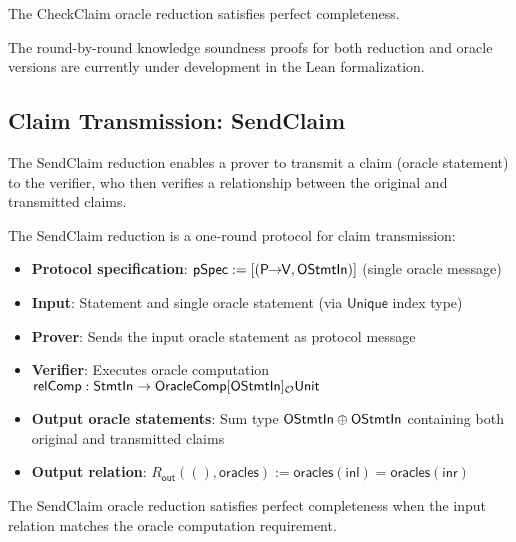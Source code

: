 \begin{theorem}
    The CheckClaim oracle reduction satisfies perfect completeness.
\end{theorem}

\begin{remark}
    The round-by-round knowledge soundness proofs for both reduction and oracle versions are currently under development in the Lean formalization.
\end{remark}

\subsection{Claim Transmission: SendClaim}

The SendClaim reduction enables a prover to transmit a claim (oracle statement) to the verifier, who then verifies a relationship between the original and transmitted claims.

\begin{definition}
    \label{def:sendclaim_oracle_reduction}
    The SendClaim reduction is a one-round protocol for claim transmission:
    \begin{itemize}
        \item \textbf{Protocol specification}: $\mathsf{pSpec} := [(\mathsf{P \!\!\rightarrow\!\! V}, \mathsf{OStmtIn})]$ (single oracle message)
        \item \textbf{Input}: Statement and single oracle statement (via $\mathsf{Unique}$ index type)
        \item \textbf{Prover}: Sends the input oracle statement as protocol message
        \item \textbf{Verifier}: Executes oracle computation $\mathsf{relComp} : \mathsf{StmtIn} \to \mathsf{OracleComp}[\mathsf{OStmtIn}]_{\mathcal{O}} \mathsf{Unit}$
        \item \textbf{Output oracle statements}: Sum type $\mathsf{OStmtIn} \oplus \mathsf{OStmtIn}$ containing both original and transmitted claims
        \item \textbf{Output relation}: $R_{\mathsf{out}}((), \mathsf{oracles}) := \mathsf{oracles}(\mathsf{inl}) = \mathsf{oracles}(\mathsf{inr})$
    \end{itemize}
\end{definition}

\begin{theorem}
    The SendClaim oracle reduction satisfies perfect completeness when the input relation matches the oracle computation requirement.
\end{theorem}

